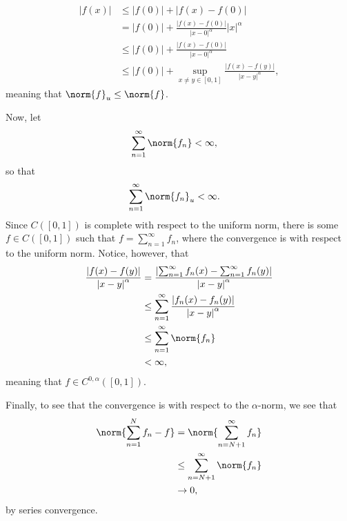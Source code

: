 \documentclass[10pt]{mypackage}
\begin{document}
\begin{enumerate}[(a)]
    \begin{align*}
      \left\vert f(x) \right\vert &\leq \left\vert f(0) \right\vert + \left\vert f(x) - f(0) \right\vert\\
                                  &= \left\vert f(0) \right\vert + \frac{\left\vert f(x)-f(0) \right\vert}{\left\vert x-0 \right\vert^{\alpha}}\left\vert x \right\vert^{\alpha}\\
                                  &\leq \left\vert f(0) \right\vert + \frac{\left\vert f(x)-f(0) \right\vert}{\left\vert x-0 \right\vert^{\alpha}}\\
                                  &\leq \left\vert f(0) \right\vert + \sup_{x\neq y\in [0,1]}\frac{\left\vert f(x)-f(y) \right\vert}{\left\vert x-y \right\vert^{\alpha}},
    \end{align*}
    meaning that $\norm{f}_{u}\leq \norm{f}$.\newline

    Now, let
    \begin{align*}
      \sum_{n=1}^{\infty}\norm{f_n} &< \infty,
    \end{align*}
    so that
    \begin{align*}
      \sum_{n=1}^{\infty}\norm{f_n}_u &< \infty.
    \end{align*}
    Since $C\left( [0,1] \right)$ is complete with respect to the uniform norm, there is some $f\in C\left( [0,1] \right)$ such that $f = \sum_{n=1}^{\infty}f_n$, where the convergence is with respect to the uniform norm. Notice, however, that
    \begin{align*}
      \frac{\left\vert f(x)-f(y) \right\vert}{\left\vert x-y \right\vert^{\alpha}} &= \frac{\left\vert \sum_{n=1}^{\infty}f_n(x) - \sum_{n=1}^{\infty}f_n(y) \right\vert}{\left\vert x-y \right\vert^{\alpha}}\\
                                                                                   &\leq \sum_{n=1}^{\infty}\frac{\left\vert f_n(x)-f_n(y) \right\vert}{\left\vert x-y \right\vert^{\alpha}}\\
                                                                                   &\leq \sum_{n=1}^{\infty}\norm{f_n}\\
                                                                                   &< \infty,
    \end{align*}
    meaning that $f\in C^{0,\alpha}\left( [0,1] \right)$.\newline

    Finally, to see that the convergence is with respect to the $\alpha$-norm, we see that
    \begin{align*}
      \norm{\sum_{n=1}^{N}f_n - f} &= \norm{\sum_{n=N+1}^{\infty}f_n}\\
                                   &\leq \sum_{n=N+1}^{\infty}\norm{f_n}\\
                                   &\rightarrow 0,
    \end{align*}
    by series convergence.
\end{enumerate}
\end{document}
